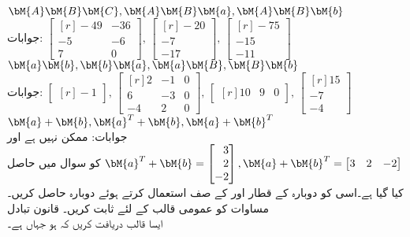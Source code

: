 \quad
$\bM{A}\bM{B}\bM{C}, \bM{A}\bM{B}\bM{a}, \bM{A}\bM{B}\bM{b}$\\
جوابات:
$\begin{bmatrix*}[r] -49&-36\\-5&-6\\7&0  \end{bmatrix*}, \, \begin{bmatrix*}[r] -20\\-7\\-17 \end{bmatrix*},\, \begin{bmatrix*}[r] -75\\-15\\-11 \end{bmatrix*}$
\quad
$\bM{a}\bM{b}, \bM{b}\bM{a}, \bM{a}\bM{B},\bM{B}\bM{b}$\\
جوابات:
$\begin{bmatrix*}[r] -1\end{bmatrix*}, \,\begin{bmatrix*}[r]2&-1&0\\6&-3&0\\-4&2&0  \end{bmatrix*},\,\begin{bmatrix*}[r]10&9&0  \end{bmatrix*},\, \begin{bmatrix*}[r]15\\-7\\-4 \end{bmatrix*}$ \\
\quad
$\bM{a}+\bM{b}, \bM{a}^T+\bM{b}, \bM{a}+\bM{b}^T$\\
جوابات: ممکن نہیں ہے اور
$\bM{a}^T+\bM{b}=\begin{bmatrix*}[r] 3\\2\\-2 \end{bmatrix*}, \bM{a}+\bM{b}^T=\begin{bmatrix*}[r]3&2&-2  \end{bmatrix*}$ 
 کو سوال  میں حاصل کیا گیا ہے۔اسی کو دوبارہ  کے قطار اور  کے صف استعمال کرتے ہوئے دوبارہ حاصل کریں۔
مساوات  کو عمومی  قالب کے لئے ثابت کریں۔
\quad قانون تبادل\\
ایسا  قالب  دریافت کریں کہ  ہو جہاں
  ہے۔

